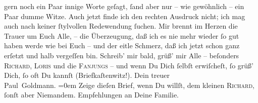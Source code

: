 \begin{ledgroupsized}[t]{13cm}
               gern noch ein Paar innige Worte geſagt, ſand aber nur – wie gewöhnlich – ein Paar
               dumme Witze. Auch jetzt finde ich den rechten Ausdruck nicht; ich mag auch nach
               keiner ſtylvollen Redewendung ſuchen. Mir brennt im Herzen die Trauer um Euch Alle, –
               die Überzeugung, daß ich es nie mehr wieder ſo gut haben werde wie bei Euch – und der
               eitle Schmerz, daß ich jetzt schon ganz erſetzt und halb vergeſſen bin.\pend
           \pstart
           Schreib’ mir bald, grüß’ mir Alle – beſonders \textsc{Richard}, \textsc{Loris} und die \textsc{Fanjungs} – und wenn Du Dich {\pb}ſelbſt erwiſcheſt, ſo
               grüß’ Dich, ſo oft Du kannſt (Briefkaſtenwitz!).\pend
           \pstart
           Dein treuer {\\[\baselineskip]}\spacefill\mbox{Paul Goldmann.}\pend
           \leftskip=0em{}\pstart
           \noindent{}Zeige dieſen Brief, wenn Du willſt, dem kleinen \textsc{Richard}, ſonſt aber Niemandem.\pend
           \pstart
           Empfehlungen an Deine Familie.\pend
           \endnumbering{}\end{ledgroupsized}  \newcommand{\dateiname}{L02660}\newcommand{\titel}{Paul Goldmann an Arthur Schnitzler, 6. 4. 1891}\newcommand{\editorInnen}{Martin Anton Müller und Laura Untner}
      